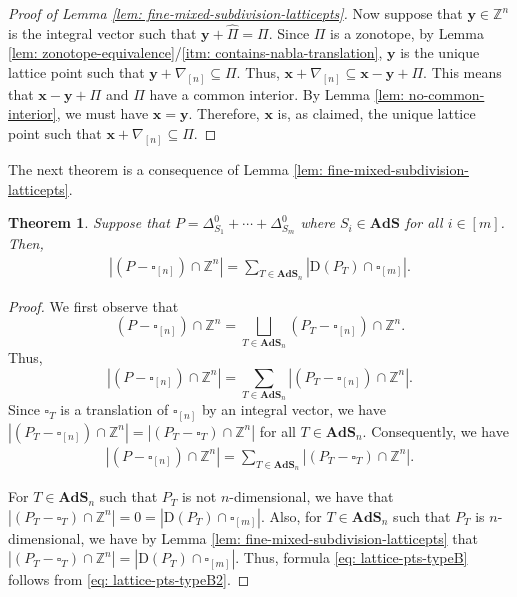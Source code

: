 \documentclass[12pt,reqno]{article}%
\newtheorem{thm}{Theorem}[section]
\theoremstyle{definition}
\numberwithin{equation}{section}
\newcommand{\bbx}{\mathbf{x}}
\newcommand{\bby}{\mathbf{y}}
\newcommand{\Z}{\mathbb Z}
\newcommand{\ads}{\mathbf{AdS}}
\begin{document}
\begin{proof}[Proof of Lemma \ref{lem: fine-mixed-subdivision-latticepts}]
Now suppose that $\bby \in \Z^n$ is the integral vector such that $\bby + \hat{\Pi} = \Pi$. Since $\Pi$ is a zonotope, by Lemma \ref{lem: zonotope-equivalence}/\eqref{itm: contains-nabla-translation}, $\bby$ is the unique lattice point such that $\bby + \nabla_{[n]} \subseteq \Pi.$  Thus, $\bbx + \nabla_{[n]} \subseteq \bbx-\bby+\Pi.$ This means that $\bbx-\bby+\Pi$ and $\Pi$ have a common interior. By Lemma \ref{lem: no-common-interior}, we must have $\bbx = \bby.$ Therefore, $\bbx$ is, as claimed, the unique lattice point such that $\bbx + \nabla_{[n]} \subseteq \Pi$.
\end{proof}

The next theorem is a consequence of Lemma \ref{lem: fine-mixed-subdivision-latticepts}.

\begin{thm}\label{thm: lattice-one-to-one} Suppose that $P = \Delta^0_{S_1} + \cdots + \Delta^0_{S_m}$ where $S_i \in \ads$ for all $i \in [m]$. Then, 
\begin{align}\label{eq: lattice-pts-typeB}
    |(P - \square_{[n]})\cap \Z^n| = \sum_{T \in \ads_n}|\mathrm{D}(P_T)\cap \square_{[m]}|.
\end{align}
\end{thm}

\begin{proof}
We first observe that 
\[(P - \square_{[n]})\cap \Z^n = \bigsqcup_{T\in \ads_n}(P_T-\square_{[n]})\cap\Z^n.\]
Thus,
\[|(P - \square_{[n]})\cap \Z^n| = \sum_{T \in \ads_n}|(P_T - \square_{[n]})\cap \Z^n|.\]
Since $\square_{T}$ is a translation of $\square_{[n]}$ by an integral vector, we have $|(P_T - \square_{[n]})\cap \Z^n| = |(P_T - \square_{T})\cap \Z^n|$ for all $T \in \ads_n$. Consequently, we have 
\begin{align}\label{eq: lattice-pts-typeB2}
    |(P - \square_{[n]})\cap \Z^n| = \sum_{T \in \ads_n}|(P_T - \square_{T})\cap \Z^n|.
\end{align}

For $T \in \ads_n$ such that $P_T$ is not $n$-dimensional, we have that $|(P_T - \square_{T})\cap \Z^n| = 0 = |\mathrm{D}(P_T)\cap \square_{[m]}|$. Also, for $T \in \ads_n$ such that $P_T$ is $n$-dimensional, we have by Lemma \ref{lem: fine-mixed-subdivision-latticepts} that $|(P_T - \square_{T})\cap \Z^n| = |\mathrm{D}(P_T)\cap \square_{[m]}|$. Thus, formula \eqref{eq: lattice-pts-typeB} follows from \eqref{eq: lattice-pts-typeB2}.
\end{proof}
\end{document}
